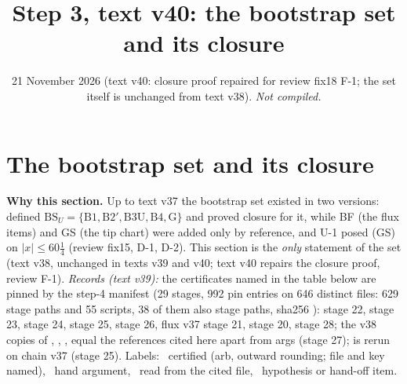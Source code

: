 \documentclass[11pt]{article}
\title{Step 3, text v40: the bootstrap set and its closure}
\author{}\date{21 November 2026 (text v40: closure proof repaired for review fix18 F-1; the set itself is unchanged from text v38). \emph{Not compiled.}}
\begin{document}
\maketitle
\fi

\section{The bootstrap set and its closure}\label{BS:sec}
\noindent\textbf{Why this section.} Up to text v37 the bootstrap set existed in two versions:  defined $\mathrm{BS}_U=\{\mathrm{B1},\mathrm{B2}',\mathrm{B3U},\mathrm{B4},\mathrm{G}\}$ and proved closure for it, while BF (the flux items) and GS (the tip chart) were added only by reference, and U-1 posed (GS) on $|x|\le60\frac14$ (review fix15, D-1, D-2). This section is the \emph{only} statement of the set (text v38, unchanged in texts v39 and v40; text v40 repairs the closure proof, review  F-1). \emph{Records (text v39):} the certificates named in the table below are pinned by the step-4 manifest  (29 stages, 992 pin entries on 646 distinct files: 629 stage paths and 55 scripts, 38 of them also stage paths, sha256 ):  stage 22,  stage 23,  stage 24,  stage 25,  stage 26, flux v37 stage 21,  stage 20,  stage 28; the v38 copies of , , ,  equal the references cited here apart from args (stage 27);  is rerun on chain v37 (stage 25). Labels: \tC\ certified (arb, outward rounding; file and key named), \tHd\ hand argument, \tR\ read from the cited file, \tH\ hypothesis or hand-off item.
\end{document}
